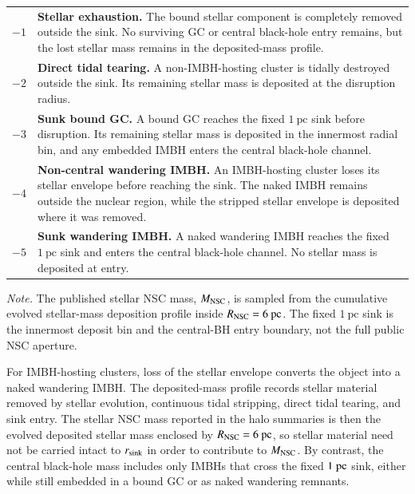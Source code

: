 \documentclass[trackchanges, twocolappendix, twocolumn]{aastex701}
\begin{document}
\begin{CJK*}{UTF8}{gbsn}
\begin{table}[!t]
\begin{tabular}{cl}
$-1$ &
\parbox[t]{0.84\textwidth}{\textbf{Stellar exhaustion.}
The bound stellar component is completely removed outside the sink. No
surviving GC or central black-hole entry remains, but the lost stellar mass
remains in the deposited-mass profile.} \\[6pt]

$-2$ &
\parbox[t]{0.84\textwidth}{\textbf{Direct tidal tearing.}
A non-IMBH-hosting cluster is tidally destroyed outside the sink. Its
remaining stellar mass is deposited at the disruption radius.} \\[6pt]

$-3$ &
\parbox[t]{0.84\textwidth}{\textbf{Sunk bound GC.}
A bound GC reaches the fixed $1~\mathrm{pc}$ sink before disruption. Its
remaining stellar mass is deposited in the innermost radial bin, and any
embedded IMBH enters the central black-hole channel.} \\[6pt]

$-4$ &
\parbox[t]{0.84\textwidth}{\textbf{Non-central wandering IMBH.}
An IMBH-hosting cluster loses its stellar envelope before reaching the sink.
The naked IMBH remains outside the nuclear region, while the stripped
stellar envelope is deposited where it was removed.} \\[6pt]

$-5$ &
\parbox[t]{0.84\textwidth}{\textbf{Sunk wandering IMBH.}
A naked wandering IMBH reaches the fixed $1~\mathrm{pc}$ sink and enters the
central black-hole channel. No stellar mass is deposited at entry.} \\

\hline
\end{tabular}

\vspace{3pt}

\parbox{0.94\textwidth}{\footnotesize
\textit{Note.}
The published stellar NSC mass, $M_{\rm NSC}$, is sampled from the cumulative
evolved stellar-mass deposition profile inside $R_{\rm NSC}=6~\mathrm{pc}$.
The fixed $1~\mathrm{pc}$ sink is the innermost deposit bin and the
central-BH entry boundary, not the full public NSC aperture.
}

\end{table}

For IMBH-hosting clusters, loss of the stellar envelope converts the object into a naked wandering IMBH\@. The deposited-mass profile records stellar material removed by stellar evolution, continuous tidal stripping, direct tidal tearing, and sink entry. The stellar NSC mass reported in the halo summaries is then the evolved deposited stellar mass enclosed by $R_{\rm NSC}=6~{\rm pc}$, so stellar material need not be carried intact to $r_{\rm sink}$ in order to contribute to $M_{\rm NSC}$. By contrast, the central black-hole mass includes only IMBHs that cross the fixed $1~{\rm pc}$ sink, either while still embedded in a bound GC or as naked wandering remnants.


\end{CJK*}
\end{document}
